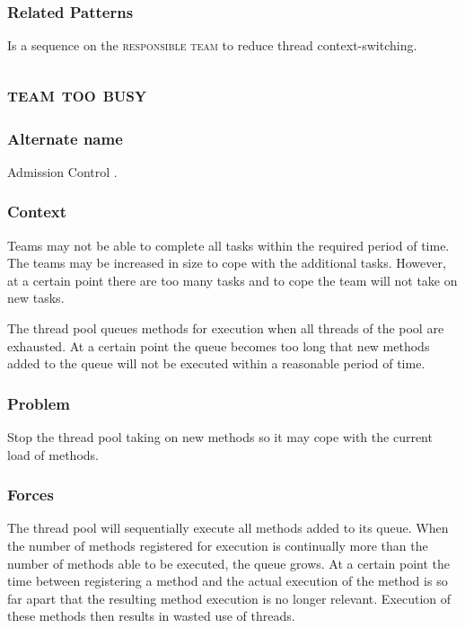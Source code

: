 \documentclass[prodmode]{style/acmlarge}
\begin{document}
\subsubsection*{Related Patterns} Is a sequence on the \textsc{responsible team}
to reduce thread context-switching.



\subsection{\textsc{\textbf{team too busy}}}

\subsubsection*{Alternate name} Admission Control \cite{seda}. 

\subsubsection*{Context} Teams may not be able to complete all tasks within the
required period of time.  The teams may be increased in size to cope with the
additional tasks.  However, at a certain point there are too many tasks and to
cope the team will not take on new tasks.

The thread pool queues methods for execution when all threads of the pool are
exhausted.  At a certain point the queue becomes too long that new methods added
to the queue will not be executed within a reasonable period of time.

\subsubsection*{Problem} Stop the thread pool taking on new methods so it may
cope with the current load of methods.

\subsubsection*{Forces} The thread pool will sequentially execute all methods
added to its queue.  When the number of methods registered for execution is
continually more than the number of methods able to be executed, the queue
grows.  At a certain point the time between registering a method and the actual
execution of the method is so far apart that the resulting method execution is
no longer relevant.  Execution of these methods then results in wasted use of
threads.
\end{document}
